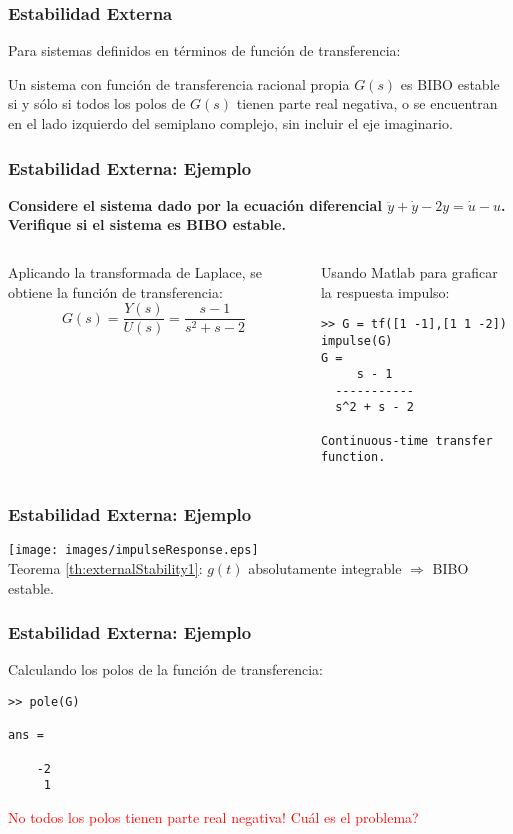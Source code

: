 \documentclass[aspectratio=169,handout]{beamer}
\theoremstyle{definition}
\theoremstyle{plain}
\theoremstyle{remark}
\begin{document}
\begin{frame}[<-+>]\frametitle{Estabilidad Externa}
	Para sistemas definidos en términos de función de transferencia:
  \begin{theorem}\label{th:externalStability2}
    Un sistema con función de transferencia racional propia $G(s)$ es BIBO estable si y sólo si todos los polos de $G(s)$ tienen parte real negativa, o se encuentran en el lado izquierdo del semiplano complejo, sin incluir el eje imaginario.
  \end{theorem}
\end{frame}

\begin{frame}[<+->][fragile]\frametitle{Estabilidad Externa: Ejemplo}
\textbf{Considere el sistema dado por la ecuación diferencial $\ddot{y} + \dot{y} - 2y = \dot{u} - u$. Verifique si el sistema es BIBO estable.}\\
\small \pause
\begin{columns}
\begin{column}{0.5\textwidth}
Aplicando la transformada de Laplace, se obtiene la función de transferencia:
\begin{equation*}
	G(s) = \frac{Y(s)}{U(s)} = \frac{s-1}{s^2+s-2}
\end{equation*}
\pause
\end{column}	
\begin{column}{0.5\textwidth}
Usando Matlab para graficar la respuesta impulso:
\begin{verbatim}
>> G = tf([1 -1],[1 1 -2])
impulse(G)
G =
     s - 1
  -----------
  s^2 + s - 2
 
Continuous-time transfer function.
\end{verbatim}
\end{column}	
\end{columns}
\end{frame}

\begin{frame}[<+->][fragile]\frametitle{Estabilidad Externa: Ejemplo}
\centering
\texttt{[image: images/impulseResponse.eps]}\\
\small \pause
Teorema \ref{th:externalStability1}: $g(t)$ absolutamente integrable $\Rightarrow$ BIBO estable.
\end{frame}

\begin{frame}[<+->][fragile]\frametitle{Estabilidad Externa: Ejemplo}
Calculando los polos de la función de transferencia:
\begin{verbatim}
>> pole(G)

ans =

    -2
     1
\end{verbatim}
\pause
\textcolor{red}{No todos los polos tienen parte real negativa! Cuál es el problema?}
\end{frame}
\end{document}
